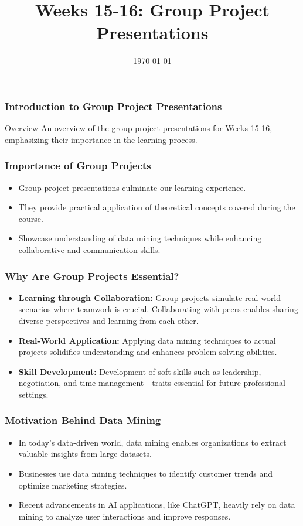 \documentclass[aspectratio=169]{beamer}
\title{Weeks 15-16: Group Project Presentations}
\author[]{}
\institute[]
{}
\date{\today}
\begin{document}
\frame{\titlepage}

\begin{frame}[fragile]
    \frametitle{Introduction to Group Project Presentations}
    \begin{block}{Overview}
        An overview of the group project presentations for Weeks 15-16, emphasizing their importance in the learning process.
    \end{block}
\end{frame}

\begin{frame}[fragile]
    \frametitle{Importance of Group Projects}
    \begin{itemize}
        \item Group project presentations culminate our learning experience.
        \item They provide practical application of theoretical concepts covered during the course.
        \item Showcase understanding of data mining techniques while enhancing collaborative and communication skills.
    \end{itemize}
\end{frame}

\begin{frame}[fragile]
    \frametitle{Why Are Group Projects Essential?}
    \begin{itemize}
        \item \textbf{Learning through Collaboration:} 
            Group projects simulate real-world scenarios where teamwork is crucial.
            Collaborating with peers enables sharing diverse perspectives and learning from each other.
        \item \textbf{Real-World Application:} 
            Applying data mining techniques to actual projects solidifies understanding and enhances problem-solving abilities.
        \item \textbf{Skill Development:} 
            Development of soft skills such as leadership, negotiation, and time management—traits essential for future professional settings.
    \end{itemize}
\end{frame}

\begin{frame}[fragile]
    \frametitle{Motivation Behind Data Mining}
    \begin{itemize}
        \item In today's data-driven world, data mining enables organizations to extract valuable insights from large datasets.
        \item Businesses use data mining techniques to identify customer trends and optimize marketing strategies.
        \item Recent advancements in AI applications, like ChatGPT, heavily rely on data mining to analyze user interactions and improve responses.
    \end{itemize}
\end{frame}
\end{document}
